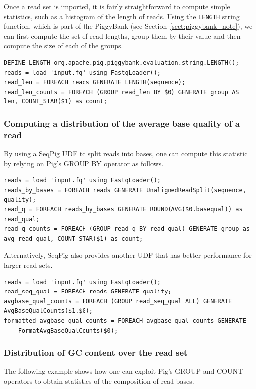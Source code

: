 Once a read set is imported, it is fairly straightforward to compute
simple statistics, such as a histogram of the length of reads. Using
the {\tt LENGTH} string function, which is part of the PiggyBank (see
Section~\ref{sect:piggybank_note}), we can first compute the set of read
lengths, group them by their value and then compute the size of each
of the groups.

\begin{lstlisting}
DEFINE LENGTH org.apache.pig.piggybank.evaluation.string.LENGTH();
reads = load 'input.fq' using FastqLoader();
read_len = FOREACH reads GENERATE LENGTH(sequence);
read_len_counts = FOREACH (GROUP read_len BY $0) GENERATE group AS len, COUNT_STAR($1) as count;
\end{lstlisting}

\subsubsection{Computing a distribution of the average base quality of a read}

By using a SeqPig UDF to split reads into bases, one can compute this
statistic by relying on Pig's GROUP BY operator as follows.
%
\begin{lstlisting}
reads = load 'input.fq' using FastqLoader();
reads_by_bases = FOREACH reads GENERATE UnalignedReadSplit(sequence, quality);
read_q = FOREACH reads_by_bases GENERATE ROUND(AVG($0.basequal)) as read_qual;
read_q_counts = FOREACH (GROUP read_q BY read_qual) GENERATE group as avg_read_qual, COUNT_STAR($1) as count;
\end{lstlisting}

Alternatively, SeqPig also provides another UDF that has better performance
for larger read sets.
%
\begin{lstlisting}
reads = load 'input.fq' using FastqLoader();
read_seq_qual = FOREACH reads GENERATE quality;
avgbase_qual_counts = FOREACH (GROUP read_seq_qual ALL) GENERATE AvgBaseQualCounts($1.$0);
formatted_avgbase_qual_counts = FOREACH avgbase_qual_counts GENERATE
    FormatAvgBaseQualCounts($0);
\end{lstlisting}

\subsubsection{Distribution of GC content over the read set}

The following example shows how one can exploit Pig's GROUP and COUNT
operators to obtain statistics of the composition of read bases.

